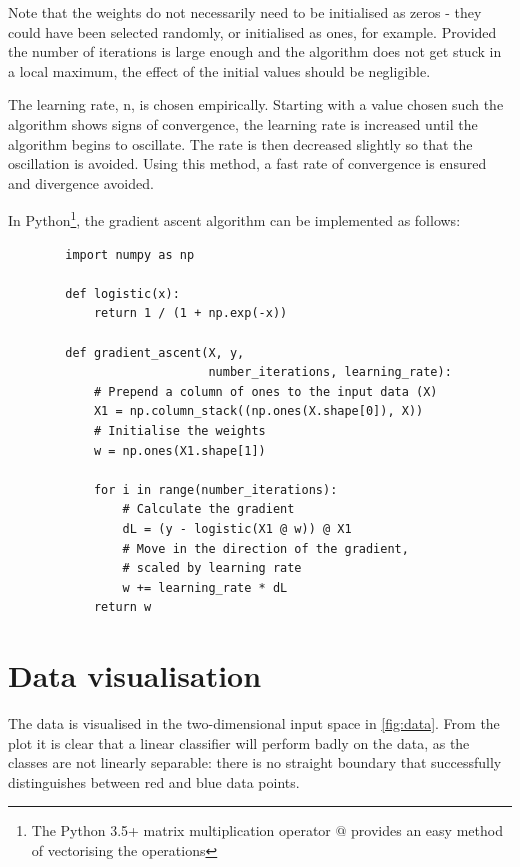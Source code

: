 \documentclass[a4paper]{article}
\begin{document}
    Note that the weights do not necessarily need to be initialised as zeros - they could have been selected randomly, or
    initialised as ones, for example. Provided the number of iterations is large enough and the algorithm does not get
    stuck in a local maximum, the effect of the initial values should be negligible.

    The learning rate, n, is chosen empirically. Starting with a value chosen such the algorithm shows signs
    of convergence, the learning rate is increased until the algorithm begins to oscillate. The rate is then decreased
    slightly so that the oscillation is avoided. Using this method, a fast rate of convergence is ensured and divergence
    avoided.

    In Python\footnote{The Python 3.5+ matrix multiplication operator $@$ provides an easy method of vectorising the
    operations}, the gradient ascent algorithm can be implemented as follows:

    \begin{verbatim}
        import numpy as np

        def logistic(x):
            return 1 / (1 + np.exp(-x))

        def gradient_ascent(X, y,
                            number_iterations, learning_rate):
            # Prepend a column of ones to the input data (X)
            X1 = np.column_stack((np.ones(X.shape[0]), X))
            # Initialise the weights
            w = np.ones(X1.shape[1])

            for i in range(number_iterations):
                # Calculate the gradient
                dL = (y - logistic(X1 @ w)) @ X1
                # Move in the direction of the gradient,
                # scaled by learning rate
                w += learning_rate * dL
            return w
    \end{verbatim}

    \section{Data visualisation}\label{sec:data-visualisation}
    The data is visualised in the two-dimensional input space in \autoref{fig:data}. From the plot it is clear that a
    linear classifier will perform badly on the data, as the classes are not linearly separable: there is no straight
    boundary that successfully distinguishes between red and blue data points.
\end{document}
